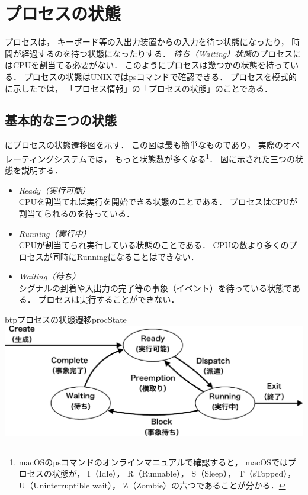 \section{プロセスの状態}
\label{procState}
プロセスは，
キーボード等の入出力装置からの入力を待つ状態になったり，
時間が経過するのを待つ状態になったりする．
\emph{待ち（Waiting）状態}のプロセスにはCPUを割当てる必要がない．
このようにプロセスは幾つかの状態を持っている．
プロセスの状態はUNIXではpsコマンドで確認できる．
プロセスを模式的に示したでは，
「プロセス情報」の「プロセスの状態」のことである．

\subsection{基本的な三つの状態}
にプロセスの状態遷移図を示す．
この図は最も簡単なものであり，
実際のオペレーティングシステムでは，
もっと状態数が多くなる\footnote{
  macOSのpsコマンドのオンラインマニュアルで確認すると，
  macOSではプロセスの状態が，
  I（Idle），
  R（Runnable），
  S（Sleep），
  T（sTopped），
  U（Uninterruptible wait），
  Z（Zombie）の六つであることが分かる．}．
図に示された三つの状態を説明する．

\begin{itemize}
\item \emph{Ready（実行可能）} \\
  CPUを割当てれば実行を開始できる状態のことである．
  プロセスはCPUが割当てられるのを待っている．
\item \emph{Running（実行中）} \\
  CPUが割当てられ実行している状態のことである．
  CPUの数より多くのプロセスが同時にRunningになることはできない．
\item \emph{Waiting（待ち）} \\
  シグナルの到着や入出力の完了等の事象（イベント）を待っている状態である．
  プロセスは実行することができない．
\end{itemize}

\begin{myfig}{btp}{プロセスの状態遷移}{procState}
  \includegraphics[scale=0.66]{Fig/procState-crop.pdf}
\end{myfig}


